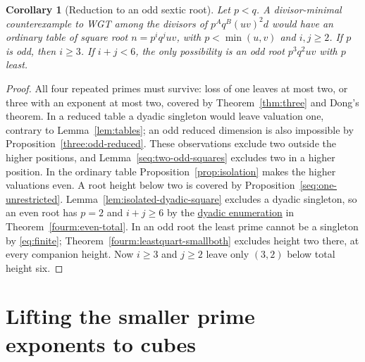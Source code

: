 \documentclass[11pt,a4paper]{article}
\numberwithin{equation}{section}
\newtheorem{corollary}[theorem]{Corollary}
\theoremstyle{remark}
\begin{document}
\begin{corollary}[Reduction to an odd sextic root]\label{fam:M:9.18}\label{cor:four-before-sextic}
Let $p<q$. A divisor-minimal counterexample to WGT among the divisors
of $p^Aq^B(uv)^2d$ would have an ordinary table of square root
$n=p^iq^juv$, with $p<\min(u,v)$ and $i,j\ge2$. If $p$ is odd,
then $i\ge3$. If $i+j<6$, the only possibility is an odd root
$p^3q^2uv$ with $p$ least.
\end{corollary}
\begin{proof}
All four repeated primes must survive: loss of one leaves at most
two, or three with an exponent at most two, covered by
Theorem~\ref{thm:three} and Dong's theorem. In a reduced table a
dyadic singleton would leave valuation one, contrary to Lemma~\ref{lem:tables}; an odd reduced dimension
is also impossible by Proposition~\ref{three:odd-reduced}. These
observations exclude two outside the higher positions, and
Lemma~\ref{seq:two-odd-squares} excludes two in a higher position.
In the ordinary table Proposition~\ref{prop:isolation} makes the
higher valuations even. A root height below two is covered by
Proposition~\ref{seq:one-unrestricted}.
Lemma~\ref{lem:isolated-dyadic-square} excludes a dyadic singleton,
so an even root has $p=2$ and $i+j\ge6$ by
the \href{https://github.com/sebastienpalcoux/WGT-fusion-categories/blob/f7f9f9a02f3116e61eb9dca4eebfed77001494e8/code/four_primes/dyadic_total_height.py}{dyadic enumeration} in Theorem~\ref{fourm:even-total}. In an odd root the least prime
cannot be a singleton by \eqref{eq:finite}; Theorem~\ref{fourm:leastquart-smallboth}
excludes height two there, at every companion height. Now $i\ge3$
and $j\ge2$ leave only $(3,2)$ below total height six.
\end{proof}

\section{Lifting the smaller prime exponents to cubes}\label{fam:M:sec:10}\label{sec:incidence}
\end{document}
